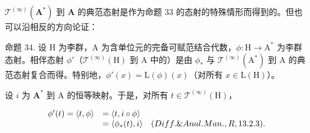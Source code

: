 \(\mathcal{T}^{(\infty)}(\mathbf{A}^*)\) 到 \(\mathbf{A}\) 的典范态射是作为命题 33 的态射的特殊情形而得到的。但也可以沿相反的方向论证：

命题 34. 设 H 为李群，A 为含单位元的完备可赋范结合代数，\(\phi: \mathrm{H} \to \mathrm{A}^*\) 为李群态射。相伴态射 \(\phi'\)（\(\mathcal{T}^{(\infty)}(\mathrm{H})\) 到 A 中的）是由 \(\phi_*\) 与 \(\mathcal{T}^{(\infty)}(\mathrm{A}^*)\) 到 A 的典范态射复合而得。特别地，\(\phi'(x) = \mathrm{L}(\phi)(x)\)（对所有 \(x \in \mathrm{L}(\mathrm{H})\)）。

设 \(i\) 为 \(\mathbf{A}^*\) 到 A 的恒等映射。于是，对所有 \(t\in \mathcal{T}^{(\infty)}(\mathrm{H})\)，

\[
\begin{array}{r l} \phi^ {\prime} (t) = \langle t, \phi \rangle & = \langle t, i \circ \phi \rangle \\ & = \langle \phi_ {*} (t), i \rangle \quad (Diff. \& Anal. Man., R, 13.2.3). \end{array}
\]

